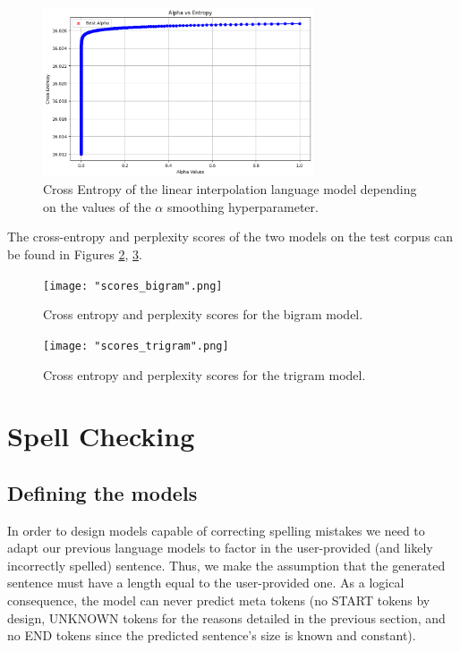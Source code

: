 \documentclass[11pt, a4paper]{article}
\begin{document}
	
	\begin{figure}
		\centering
		\includegraphics[width=8cm]{"interpolation_alpha.png"}
		\caption{Cross Entropy of the linear interpolation language model depending on the values of the $\alpha$ smoothing hyperparameter.}
		\label{fig::li_alpha_entropy}
	\end{figure}


	The cross-entropy and perplexity scores of the two models on the test corpus can be found in Figures \ref{fig::scores_bigram}, \ref{fig::scores_trigram}.

	\begin{figure}
	    \centering
	    \texttt{[image: "scores\_bigram".png]}
	    \caption{Cross entropy and perplexity scores for the bigram model.}
	    \label{fig::scores_bigram}
	\end{figure}
	
	\begin{figure}
	    \centering
	    \texttt{[image: "scores\_trigram".png]}
	    \caption{Cross entropy and perplexity scores for the trigram model.}
	    \label{fig::scores_trigram}
	\end{figure}


	
	\section{Spell Checking}
	
	
	\subsection{Defining the models}
	
	In order to design models capable of correcting spelling mistakes we need to adapt our previous language models to factor in the user-provided (and likely incorrectly spelled) sentence. Thus, we make the assumption that the generated sentence must have a length equal to the user-provided one. As a logical consequence, the model can never predict meta tokens (no START tokens by design, UNKNOWN tokens for the reasons detailed in the previous section, and no END tokens since the predicted sentence's size is known and constant).
	
\end{document}
